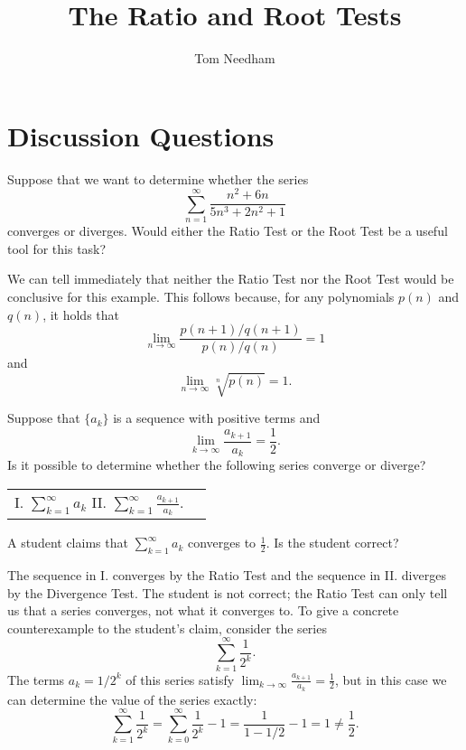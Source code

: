 \documentclass[]{ximera}
\author{Tom Needham}
\title[]{The Ratio and Root Tests}
\begin{document}
\begin{abstract}
\end{abstract}
\maketitle

\vspace{-0.5in}

\section{Discussion Questions}

\begin{problem}
Suppose that we want to determine whether the series
$$
\sum_{n=1}^\infty \frac{n^2+6n}{5n^3 + 2n^2 + 1}
$$
converges or diverges. Would either the Ratio Test or the Root Test be a useful tool for this task?

\begin{solution}
We can tell immediately that neither the Ratio Test nor the Root Test would be conclusive for this example. This follows because, for any polynomials $p(n)$ and $q(n)$, it holds that
$$
\lim_{n\rightarrow \infty} \frac{p(n+1)/q(n+1)}{p(n)/q(n)} = 1
$$
and 
$$
\lim_{n\rightarrow \infty} \sqrt[n]{p(n)} = 1.
$$
\end{solution}
\end{problem}

\begin{problem}
Suppose that $\{a_k\}$ is a sequence with positive terms and 
$$
\lim_{k \rightarrow \infty} \frac{a_{k+1}}{a_k} = \frac{1}{2}.
$$
Is it possible to determine whether the following series converge or diverge?
\begin{center}
\begin{tabular}{ll}
I. $\sum_{k=1}^\infty a_k$ \hspace{1in} II. $\sum_{k=1}^\infty \frac{a_{k+1}}{a_k}$.
\end{tabular}
\end{center}
A student claims that $\sum_{k=1}^\infty a_k$ converges to $\frac{1}{2}$. Is the student correct?

\begin{solution}
The sequence in I. converges by the Ratio Test and the sequence in II. diverges by the Divergence Test. The student is not correct; the Ratio Test can only tell us that a series converges, not what it converges to. To give a concrete counterexample to the student's claim, consider the series 
$$
\sum_{k=1}^\infty \frac{1}{2^k}.
$$
The terms $a_k = 1/2^k$ of this series satisfy $\lim_{k \rightarrow \infty} \frac{a_{k+1}}{a_k} = \frac{1}{2}$, but in this case we can determine the value of the series exactly:
$$
\sum_{k=1}^\infty \frac{1}{2^k} = \sum_{k=0}^\infty \frac{1}{2^k} - 1 = \frac{1}{1-1/2} - 1 = 1 \neq \frac{1}{2}.
$$
\end{solution}
\end{problem}
\end{document}
